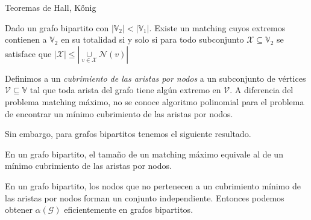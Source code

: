 \documentclass[8pt,xcolor={dvipsnames}]{beamer}
\begin{document}
\begin{frame}{Teoremas de Hall, K\H{o}nig}
	
	
	\begin{tcolorbox}[title=Teorema de Hall]
	    Dado un grafo bipartito con $|\mathbb{V}_2| < |\mathbb{V}_1|$. Existe un matching cuyos extremos contienen a $\mathbb{V}_2$ en su totalidad si y solo si para todo subconjunto $\mathcal{X} \subseteq \mathbb{V}_2$ se satisface que $|\mathcal{X}| \leq |\underset{v \in \mathcal{X}}{\cup} \mathcal{N}(v)|$
	\end{tcolorbox}

	\pause
	
	Definimos a un \textit{cubrimiento de las aristas por nodos} a un subconjunto de v\'ertices $\mathcal{V} \subseteq \mathbb{V}$ tal que toda arista del grafo tiene alg\'un extremo en $\mathcal{V}$. A diferencia del problema matching m\'aximo, no se conoce algoritmo polinomial para el problema de encontrar un m\'inimo cubrimiento de las aristas por nodos.
	
	\pause
	Sin embargo, para grafos bipartitos tenemos el siguiente resultado.
	\begin{tcolorbox}[title=Teorema de König]
	    En un grafo bipartito, el tama\~no de un matching m\'aximo equivale al de un m\'inimo cubrimiento de las aristas por nodos.
	\end{tcolorbox}
	
	\pause
	En un grafo bipartito, los nodos que no pertenecen a un cubrimiento m\'inimo de las aristas por nodos forman un conjunto independiente. Entonces podemos obtener $\alpha(\mathcal{G})$ eficientemente en grafos bipartitos.
	
\end{frame}

	
	
\end{document}

